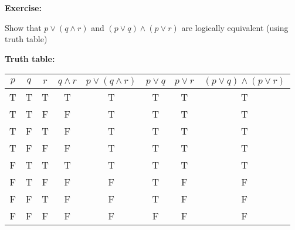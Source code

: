 \begin{tcolorbox}[title=Example 3: Distributive law
of disjunction over conjunction]
\textbf{Exercise:}  
\begin{center}
Show that $p\lor (q\land r) $ and $(p\lor q) \land (p \lor r)$  are logically equivalent (using truth table) 
\end{center}
\textbf{Truth table:}
\begin{center}
\begin{tabular}{|c|c|c!{\vrule width 1.5pt}c|c!{\vrule width 1.5pt}c|c|c|}
\hline
{}
$p$ & $q$ & $r$ & $q \land r$ & $p \lor (q \land r)$ & $p \lor q$ & $p \lor r$ & $(p\lor q) \land (p\lor r)$ \\
\hline
T & T & T & T & T & T & T & T \\
\hline
T & T & F & F & T & T & T & T \\
\hline
T & F & T & F & T & T & T & T \\
\hline
T & F & F & F & T & T & T & T \\
\hline
F & T & T & T & T & T & T & T \\
\hline
F & T & F & F & F & T & F & F \\
\hline
F & F & T & F & F & T & F & F
\\
\hline
F & F & F & F & F & F & F & F \\ \hline
\end{tabular}    
\end{center}
\end{tcolorbox}

